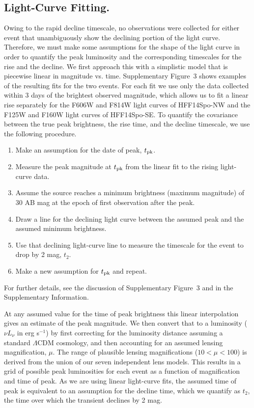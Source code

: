 \documentclass{article}
\def\LCDM{$\Lambda$CDM\xspace}
\def\spockone{HFF14Spo-NW\xspace}
\def\spocktwo{HFF14Spo-SE\xspace}
\begin{document}
\subsection{Light-Curve Fitting.}\label{sec:LightCurves}

Owing to the rapid decline timescale, no observations were collected
for either event that unambiguously show the declining portion of the
light curve. Therefore, we must make some assumptions for the shape of
the light curve in order to quantify the peak luminosity and the
corresponding timescales for the rise and the decline.  We first
approach this with a simplistic model that is piecewise linear in
magnitude vs. time. Supplementary Figure~3 shows examples of the
resulting fits for the two events.  For each fit we use only the data
collected within 3 days of the brightest observed magnitude, which
allows us to fit a linear rise separately for the F606W and F814W
light curves of \spockone and the F125W and F160W light curves of
\spocktwo. To quantify the covariance between the true peak
brightness, the rise time, and the decline timescale, we use the
following procedure.

\begin{enumerate}
\item Make an assumption for the date of peak, $t_{\rm pk}$.
\item Measure the peak magnitude at $t_{\rm pk}$ from the linear fit
  to the rising light-curve data.
\item Assume the source reaches a minimum brightness (maximum
  magnitude) of 30 AB mag at the epoch of first observation after the
  peak.
\item Draw a line for the declining light curve between the assumed
  peak and the assumed minimum brightness.
\item Use that declining light-curve line to measure the timescale for
  the event to drop by 2 mag, $t_2$.
\item Make a new assumption for $t_{\rm pk}$ and repeat.
\end{enumerate}

\noindent For further details, see the discussion of Supplementary
Figure~3 and in the Supplementary Information.

At any assumed value for the time of peak brightness this linear
interpolation gives an estimate of the peak magnitude. We then convert
that to a luminosity ($\nu L_\nu$ in erg s$^{-1}$) by first
correcting for the luminosity distance assuming a standard \LCDM
cosmology, and then accounting for an assumed lensing magnification,
$\mu$.  The range of plausible lensing magnifications ($10<\mu<100$)
is derived from the union of our seven independent lens models.  This
results in a grid of possible peak luminosities for each event as a
function of magnification and time of peak.  As we are using linear
light-curve fits, the assumed time of peak is equivalent to an
assumption for the decline time, which we quantify as $t_2$, the time
over which the transient declines by 2 mag.
\end{document}
